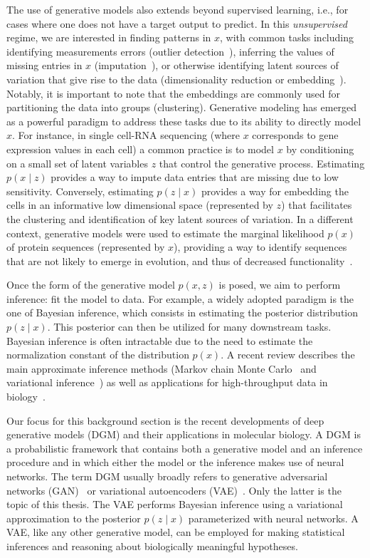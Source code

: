 The use of generative models also extends beyond supervised learning, i.e., for cases where one does not have a target output to predict. In this \textit{unsupervised} regime, we are interested in finding patterns in $x$, with common tasks including identifying measurements errors (outlier detection~\cite{Ding2018}), inferring the values of missing entries in $x$ (imputation~\cite{pmlr-v97-mattei19a}), or otherwise identifying latent sources of variation that give rise to the data (dimensionality reduction or embedding~\cite{Lopez2018}). Notably, it is important to note that the embeddings are commonly used for partitioning the data into groups (clustering). Generative modeling has emerged as a powerful paradigm to address these tasks due to its ability to directly model $x$. For instance, in single cell-RNA sequencing (where $x$ corresponds to gene expression values in each cell) a common practice is to model $x$ by conditioning on a small set of latent variables $z$ that control the generative process. Estimating $p(x \mid z)$ provides a way to impute data entries that are missing due to low sensitivity. Conversely, estimating $p(z \mid x)$ provides a way for embedding the cells in an informative low dimensional space (represented by $z$) that facilitates the clustering and identification of key latent sources of variation. In a different context, generative models were used to estimate the marginal likelihood $p(x)$ of protein sequences (represented by $x$), providing a way to identify sequences that are not likely to emerge in evolution, and thus of decreased functionality~\cite{Riesselman2018}. 

Once the form of the generative model $p(x, z)$ is posed, we aim to perform inference: fit the model to data. For example, a widely adopted paradigm is the one of Bayesian inference, which consists in estimating the posterior distribution $p(z \mid x)$. This posterior can then be utilized for many downstream tasks. Bayesian inference is often intractable due to the need to estimate the normalization constant of the distribution $p(x)$. A recent review describes the main approximate inference methods (Markov chain Monte Carlo~\cite{andrieu2003introduction} and variational inference~\cite{jordan1999introduction}) as well as applications for high-throughput data in biology~\cite{Yau2019}. 

Our focus for this background section is the recent developments of deep generative models (DGM) and their applications in molecular biology. A DGM is a probabilistic framework that contains both a generative model and an inference procedure and in which either the model or the inference makes use of neural networks. The term DGM usually broadly refers to generative adversarial networks (GAN)~\cite{Goodfellow2014} or variational autoencoders (VAE)~\cite{Kingma2014, Rezende2014}. Only the latter is the topic of this thesis. The VAE performs Bayesian inference using a variational approximation to the posterior $p(z \mid x)$ parameterized with neural networks. A VAE, like any other generative model, can be employed for making statistical inferences and reasoning about biologically meaningful hypotheses. 

